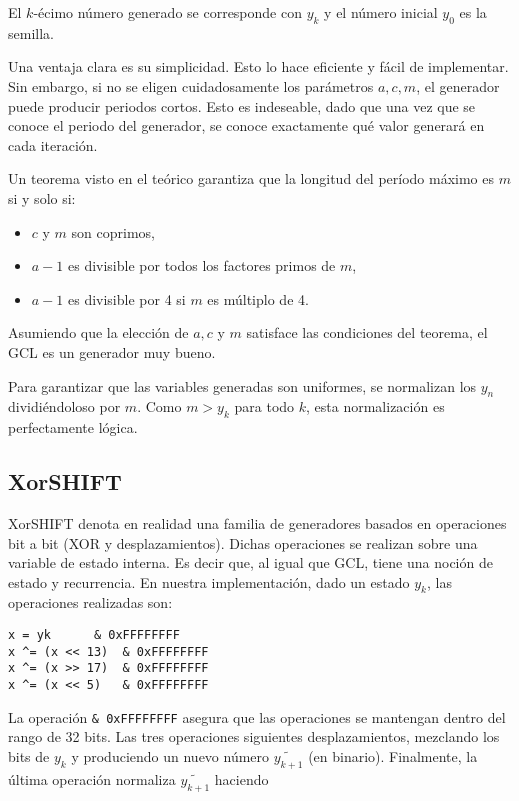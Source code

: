 \documentclass[a4paper, 12pt]{article}
\begin{document}
El $k$-écimo número generado se corresponde con $y_k$ y el número inicial $y_0$
es la semilla.

Una ventaja clara es su simplicidad. Esto lo hace eficiente y fácil de
implementar. Sin embargo, si no se eligen cuidadosamente los parámetros $a, c,
m$, el generador puede producir periodos cortos. Esto es indeseable, dado que
una vez que se conoce el periodo del generador, se conoce exactamente qué valor
generará en cada iteración.

Un teorema visto en el teórico garantiza que la longitud del período máximo es
$m$ si y solo si:

\begin{itemize}
    \item $c$ y $m$ son coprimos,
    \item $a - 1$ es divisible por todos los factores primos de $m$,
    \item $a - 1$ es divisible por 4 si $m$ es múltiplo de 4.
\end{itemize}

Asumiendo que la elección de $a, c$ y $m$ satisface las condiciones del teorema,
el GCL es un generador muy bueno. 

Para garantizar que las variables generadas son uniformes, se normalizan los
$y_n$ dividiéndoloso por $m$. Como $m > y_k$ para todo $k$, esta normalización
es perfectamente lógica.

\subsection{XorSHIFT}

XorSHIFT denota en realidad una familia de generadores basados en operaciones
bit a bit (XOR y desplazamientos). Dichas operaciones se realizan sobre una
variable de estado interna. Es decir que, al igual que GCL, tiene una noción de
estado y recurrencia. En nuestra implementación, dado un estado $y_k$, las
operaciones realizadas son:

\begin{verbatim}
x = yk      & 0xFFFFFFFF
x ^= (x << 13)  & 0xFFFFFFFF
x ^= (x >> 17)  & 0xFFFFFFFF
x ^= (x << 5)   & 0xFFFFFFFF
\end{verbatim}

La operación \texttt{\& 0xFFFFFFFF} asegura que las operaciones se mantengan
dentro del rango de 32 bits. Las tres operaciones siguientes desplazamientos,
mezclando los bits de $y_k$ y produciendo un nuevo número $\widetilde{y_{k+1}}$ (en
binario). Finalmente, la última operación normaliza $\widetilde{y_{k+1}}$ haciendo 
\end{document}
